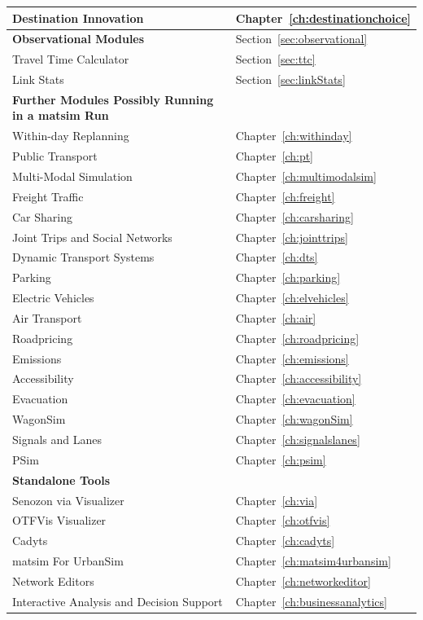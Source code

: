 \begin{center}
\begin{longtable}{|l|l|}
	Destination Innovation & Chapter~\ref{ch:destinationchoice} \\
	\hline
	\textbf{Observational Modules} & Section~\ref{sec:observational} \\
	\hline
	Travel Time Calculator & Section~\ref{sec:ttc} \\
	Link Stats & Section~\ref{sec:linkStats} \\
	\hline
	\textbf{Further Modules Possibly Running in a \gls{matsim} Run} & \\
	\hline
	Within-day Replanning & Chapter~\ref{ch:withinday} \\
	Public Transport & Chapter~\ref{ch:pt} \\
	Multi-Modal Simulation & Chapter~\ref{ch:multimodalsim} \\
	Freight Traffic & Chapter~\ref{ch:freight} \\
	Car Sharing & Chapter~\ref{ch:carsharing} \\
	Joint Trips and Social Networks & Chapter~\ref{ch:jointtrips} \\
	Dynamic Transport Systems & Chapter~\ref{ch:dts} \\
	Parking & Chapter~\ref{ch:parking} \\
	Electric Vehicles & Chapter~\ref{ch:elvehicles} \\
	Air Transport & Chapter~\ref{ch:air} \\
	Roadpricing & Chapter~\ref{ch:roadpricing} \\
	Emissions & Chapter~\ref{ch:emissions} \\
	Accessibility & Chapter~\ref{ch:accessibility} \\
	Evacuation & Chapter~\ref{ch:evacuation}  \\
	WagonSim & Chapter~\ref{ch:wagonSim} \\
	Signals and Lanes & Chapter~\ref{ch:signalslanes} \\
	PSim & Chapter~\ref{ch:psim} \\
	\hline
	\textbf{Standalone Tools} & \\ %
	\hline
	Senozon via Visualizer & Chapter~\ref{ch:via} \\
	OTFVis Visualizer & Chapter~\ref{ch:otfvis} \\
	Cadyts & Chapter~\ref{ch:cadyts} \\
	\gls{matsim} For UrbanSim & Chapter~\ref{ch:matsim4urbansim} \\	
	Network Editors &  Chapter~\ref{ch:networkeditor} \\
	Interactive Analysis and Decision Support & Chapter~\ref{ch:businessanalytics} \\
\end{longtable}
\end{center}


